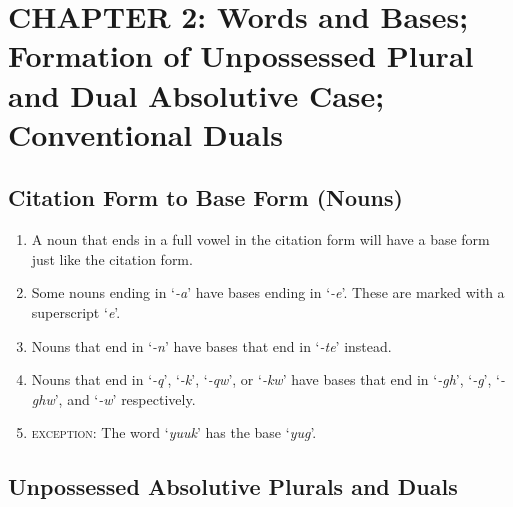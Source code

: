 \documentclass{article}
\begin{document}
\section{}

\section{CHAPTER 2: Words and Bases; Formation of Unpossessed Plural and Dual
Absolutive Case; Conventional Duals}

\subsection{Citation Form to Base Form (Nouns)}

\begin{enumerate}
\item A noun that ends in a full vowel in the citation form will have a base form just like the citation form.
\item Some nouns ending in `\textit{-a}' have bases ending in `\textit{-e}'. These are marked with a superscript `\textit{e}'.
\item Nouns that end in `\textit{-n}' have bases that end in `\textit{-te}' instead.
\item Nouns that end in `\textit{-q}', `\textit{-k}', `\textit{-qw}', or `\textit{-kw}' have bases that end in `\textit{-gh}', `\textit{-g}', `\textit{-ghw}', and `\textit{-w}' respectively.
\item \textsc{exception}: The word `\textit{yuuk}' has the base `\textit{yug}'.
\end{enumerate}

\subsection{Unpossessed Absolutive Plurals and Duals}
\end{document}
